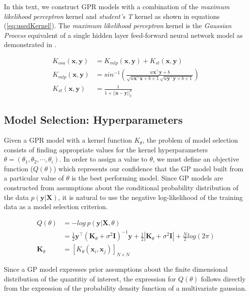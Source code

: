 \documentclass{article}
\begin{document}
In this text, we construct GPR models with a combination of the \emph{maximum likelihood perceptron} kernel and \emph{student's T} kernel as shown in equations (\ref{eq:usedKernel}). The \emph{maximum likelihood perceptron} kernel is the \emph{Gaussian Process} equivalent of a single hidden layer feed-forward neural network model as demonstrated in \citet{Neal:1996:BLN:525544}.

\begin{align}
  K_{osa}(\mathbf{x}, \mathbf{y}) & = K_{mlp}(\mathbf{x}, \mathbf{y}) + K_{st}(\mathbf{x}, \mathbf{y}) \label{eq:usedKernel} \\
  K_{mlp}(\mathbf{x}, \mathbf{y}) & = sin^{-1}(\frac{w\mathbf{x}^\intercal \mathbf{y} + b}{\sqrt{w\mathbf{x}^\intercal \mathbf{x} + b + 1} \sqrt{w\mathbf{y}^\intercal \mathbf{y} + b + 1}}) \\
  K_{st}(\mathbf{x}, \mathbf{y}) & = \frac{1}{1 + ||\mathbf{x} - \mathbf{y}||_{2}^d}
\end{align}


\subsection{Model Selection: Hyperparameters}

Given a GPR model with a kernel function $K_\theta$, the problem of
model selection consists of finding appropriate values for the kernel
hyperparameters $\theta = \left(\theta_1, \theta_2, \cdots, \theta_i\right)$.  In order to assign a value to $\theta$, we must
define an objective function ($Q(\theta)$) which represents our confidence that the GP model built from a particular value of $\theta$ is the best performing model. Since GP models are constructed from assumptions about the conditional probability distribution of the data $p(\mathbf{y}|\mathbf{X})$, it is natural to use the negative log-likelihood of the training data as a model selection criterion. 

\begin{align*}
  Q(\theta) & = - log \ p(\mathbf{y}|\mathbf{X}, \theta) \\
            & = \frac{1}{2} \mathbf{y}^\intercal (\mathbf{K}_\theta + \sigma^{2} \mathbf{I})^{-1} \mathbf{y} + \frac{1}{2}|\mathbf{K}_\theta + \sigma^{2} \mathbf{I}| + \frac{N}{2}log(2\pi) \\
  \mathbf{K}_\theta & = [K_{\theta}(\mathbf{x}_i, \mathbf{x}_j)]_{N \times N}
\end{align*}

Since a GP model expresses prior assumptions about the finite
dimensional distribution of the quantitiy of interest, the expression
for $Q(\theta)$ follows directly from the expression of the
probability density function of a multivariate gaussian.
\end{document}
